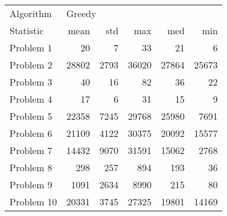 \begin{tabular}{lrrrrr}
\toprule
Algorithm & \multicolumn{5}{l}{Greedy} \\
Statistic &   mean &   std &    max &    med &    min \\
\midrule
Problem 1  &     20 &     7 &     33 &     21 &      6 \\
Problem 2  &  28802 &  2793 &  36020 &  27864 &  25673 \\
Problem 3  &     40 &    16 &     82 &     36 &     22 \\
Problem 4  &     17 &     6 &     31 &     15 &      9 \\
Problem 5  &  22358 &  7245 &  29768 &  25980 &   7691 \\
Problem 6  &  21109 &  4122 &  30375 &  20092 &  15577 \\
Problem 7  &  14432 &  9070 &  31591 &  15062 &   2768 \\
Problem 8  &    298 &   257 &    894 &    193 &     36 \\
Problem 9  &   1091 &  2634 &   8990 &    215 &     80 \\
Problem 10 &  20331 &  3745 &  27325 &  19801 &  14169 \\
\bottomrule
\end{tabular}

